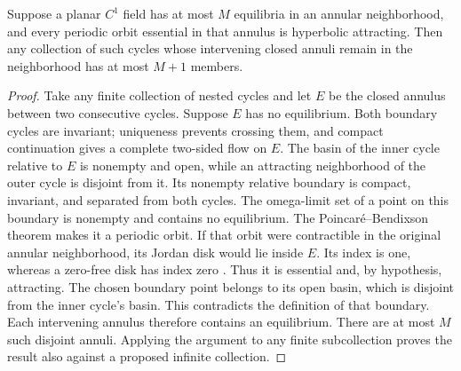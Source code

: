 \begin{lemma}\label{lem:attracting-annulus}
Suppose a planar $C^1$ field has at most $M$ equilibria in an annular
neighborhood, and every periodic orbit essential in that annulus is
hyperbolic attracting. Then any collection of such cycles whose
intervening closed annuli remain in the neighborhood has at most
$M+1$ members.
\end{lemma}
\begin{proof}
Take any finite collection of nested cycles and let $E$ be the closed
annulus between two consecutive cycles. Suppose $E$ has no equilibrium.
Both boundary cycles are invariant; uniqueness prevents crossing them,
and compact continuation gives a complete two-sided flow on $E$.
The basin of the inner cycle relative to $E$ is nonempty and open,
while an attracting neighborhood of the outer cycle is disjoint from it.
Its nonempty relative boundary is compact, invariant, and separated
from both cycles. The omega-limit set of a point on this boundary is
nonempty and contains no equilibrium. The Poincar\'e--Bendixson theorem
\cite[Section~7.3, Lemma~7.13]{Teschl2012} makes it a periodic orbit.
If that orbit were contractible in the original annular neighborhood,
its Jordan disk would lie inside $E$. Its index is one, whereas a
zero-free disk has index zero
\cite[Section~3.12, Theorems~1--3]{Perko2001}. Thus it is essential
and, by hypothesis, attracting. The chosen boundary point belongs
to its open basin, which is disjoint from the inner cycle's basin.
This contradicts the definition of that boundary. Each intervening
annulus therefore contains an equilibrium.
There are at most $M$ such disjoint annuli. Applying the argument to
any finite subcollection proves the result also against a proposed
infinite collection.
\end{proof}

